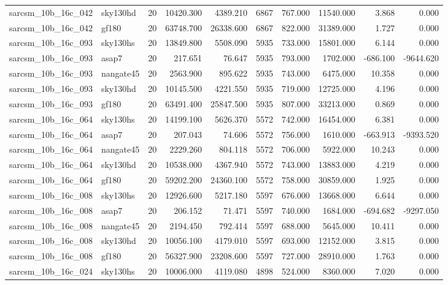 \begin{tabular}{llrrrrrrrr}
sarcsm\_10b\_16c\_042 & sky130hd & 20 & 10420.300 & 4389.210 & 6867 & 767.000 & 11540.000 & 3.868 & 0.000 \\
sarcsm\_10b\_16c\_042 & gf180 & 20 & 63748.700 & 26338.600 & 6867 & 822.000 & 31389.000 & 1.727 & 0.000 \\
sarcsm\_10b\_16c\_093 & sky130hs & 20 & 13849.800 & 5508.090 & 5935 & 733.000 & 15801.000 & 6.144 & 0.000 \\
sarcsm\_10b\_16c\_093 & asap7 & 20 & 217.651 & 76.647 & 5935 & 793.000 & 1702.000 & -686.100 & -9644.620 \\
sarcsm\_10b\_16c\_093 & nangate45 & 20 & 2563.900 & 895.622 & 5935 & 743.000 & 6475.000 & 10.358 & 0.000 \\
sarcsm\_10b\_16c\_093 & sky130hd & 20 & 10145.500 & 4221.550 & 5935 & 719.000 & 12725.000 & 4.196 & 0.000 \\
sarcsm\_10b\_16c\_093 & gf180 & 20 & 63491.400 & 25847.500 & 5935 & 807.000 & 33213.000 & 0.869 & 0.000 \\
sarcsm\_10b\_16c\_064 & sky130hs & 20 & 14199.100 & 5626.370 & 5572 & 742.000 & 16454.000 & 6.381 & 0.000 \\
sarcsm\_10b\_16c\_064 & asap7 & 20 & 207.043 & 74.606 & 5572 & 756.000 & 1610.000 & -663.913 & -9393.520 \\
sarcsm\_10b\_16c\_064 & nangate45 & 20 & 2229.260 & 804.118 & 5572 & 706.000 & 5922.000 & 10.243 & 0.000 \\
sarcsm\_10b\_16c\_064 & sky130hd & 20 & 10538.000 & 4367.940 & 5572 & 743.000 & 13883.000 & 4.219 & 0.000 \\
sarcsm\_10b\_16c\_064 & gf180 & 20 & 59202.200 & 24360.100 & 5572 & 758.000 & 30859.000 & 1.925 & 0.000 \\
sarcsm\_10b\_16c\_008 & sky130hs & 20 & 12926.600 & 5217.180 & 5597 & 676.000 & 13668.000 & 6.644 & 0.000 \\
sarcsm\_10b\_16c\_008 & asap7 & 20 & 206.152 & 71.471 & 5597 & 740.000 & 1684.000 & -694.682 & -9297.050 \\
sarcsm\_10b\_16c\_008 & nangate45 & 20 & 2194.450 & 792.414 & 5597 & 688.000 & 5645.000 & 10.411 & 0.000 \\
sarcsm\_10b\_16c\_008 & sky130hd & 20 & 10056.100 & 4179.010 & 5597 & 693.000 & 12152.000 & 3.815 & 0.000 \\
sarcsm\_10b\_16c\_008 & gf180 & 20 & 56327.900 & 23208.600 & 5597 & 727.000 & 28910.000 & 1.763 & 0.000 \\
sarcsm\_10b\_16c\_024 & sky130hs & 20 & 10006.000 & 4119.080 & 4898 & 524.000 & 8360.000 & 7.020 & 0.000 \\

\end{tabular}
